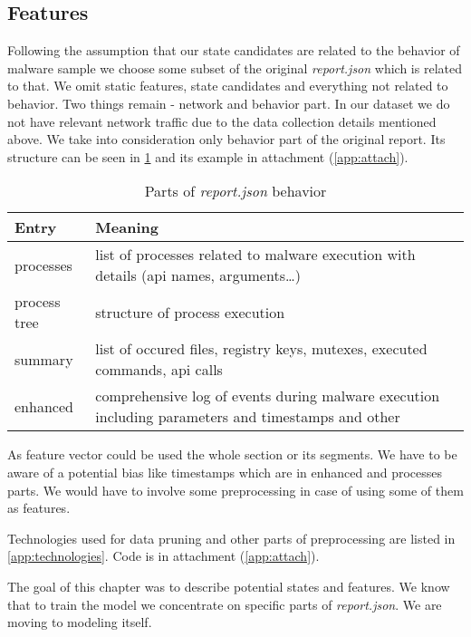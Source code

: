 \subsection{Features}
Following the assumption that our state candidates are related to the behavior of malware sample we choose some subset of the original \emph{report.json} which is related to that. We omit static features, state candidates and everything not related to behavior. Two things remain - network and behavior part. In our dataset we do not have relevant network traffic due to the data collection details mentioned above. We take into consideration only behavior part of the original report. Its structure can be seen in \ref{tab:behavioral} and its example in attachment (\ref{app:attach}).

\begin{table}[h]
    \centering
    \caption{Parts of \emph{report.json} behavior}
    \begin{tabular}{p{2cm}p{12cm}} 
        \toprule
        \textbf{Entry} &
        \textbf{Meaning} \\
        \midrule
        processes & list of processes related to malware execution with details (api names, arguments\dots) \\
        \midrule
        process tree & structure of process execution\\
        \midrule
        summary & list of occured files, registry keys, mutexes, executed commands, api calls \\
        \midrule
        enhanced & comprehensive log of events during malware execution including parameters and timestamps and other\\
        \bottomrule
    \end{tabular}
    \label{tab:behavioral}
\end{table}

As feature vector could be used the whole section or its segments. We have to be aware of a potential bias like timestamps which are in enhanced and processes parts. We would have to involve some preprocessing in case of using some of them as features.

Technologies used for data pruning and other parts of preprocessing are listed in \ref{app:technologies}. Code is in attachment (\ref{app:attach}).

The goal of this chapter was to describe potential states and features. We know that to train the model we concentrate on specific parts of \emph{report.json}. We are moving to modeling itself.



